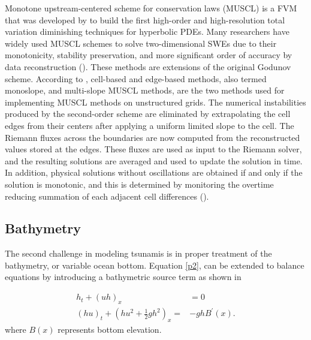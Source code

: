\documentclass[10pt,a4paper]{article}
\begin{document}
Monotone upstream-centered scheme for conservation laws (MUSCL) is a FVM that was developed by  \citet{van1979towards} to build the first high-order and high-resolution total variation diminishing techniques for hyperbolic PDEs. Many researchers have widely used MUSCL schemes to solve two-dimensional SWEs due to their monotonicity, stability preservation, and more significant order of accuracy by data reconstruction (\cite{song2011robust,zhao2019improved,marche2007evaluation,liang2009adaptive}).  These methods are extensions of the original Godunov scheme.     According to \citet{hou20132d}, cell-based and edge-based methods, also termed monoslope, and multi-slope MUSCL methods, are the two methods used for implementing MUSCL methods on unstructured grids. The numerical instabilities produced by the second-order scheme are eliminated by extrapolating the cell edges from their centers after applying a uniform limited slope to the cell. The Riemann fluxes across the boundaries are now computed from the reconstructed values stored at the edges.  These fluxes are used as input to the Riemann solver, and the resulting solutions are averaged and used to update the solution in time.  In addition, physical solutions without oscillations are obtained if and only if the solution is monotonic, and this is determined by monitoring the overtime reducing summation of each adjacent cell differences (\cite{hou2014multislope}).





	
	\subsection{Bathymetry}
	The second challenge in modeling tsunamis is in proper treatment of the bathymetry, or variable ocean bottom. 
	Equation \eqref{p2}, can be extended to balance equations by introducing a bathymetric source term as shown in 

		\begin{equation}
		\begin{aligned}
			h_{t} + (uh)_x &= 0 \\
			(hu)_t + \left(hu^{2} + \frac{1}{2}gh^{2} \right)_x =& -ghB^{\prime}(x).
			\label{bst}
		\end{aligned}
	\end{equation}	
	where $B(x)$ represents bottom elevation. 
\end{document}
